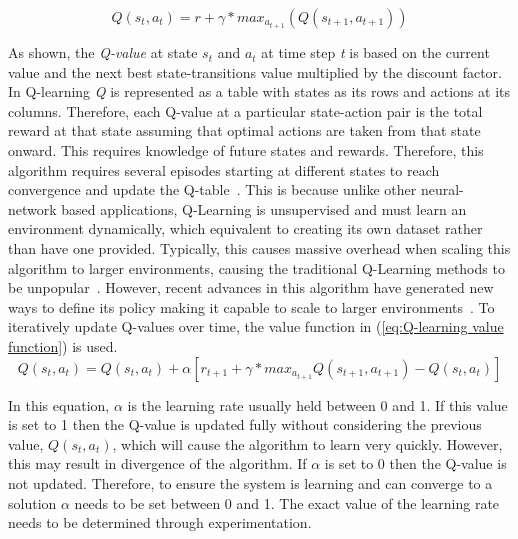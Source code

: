 \documentclass[12pt,american]{report}
\begin{document}
        \begin{equation}
            \label{eq:bellman}
            Q(s_{t},a_{t}) = r + \gamma*max_{a_{t+1} }(Q(s_{t+1},a_{t+1}))
        \end{equation}
        
        As shown, the \textit{Q-value} at state \textit{$s_t$} and \textit{$a_t$} at time step \textit{t} is based on the current value and the next best state-transitions value multiplied by the discount factor. In Q-learning \textit{Q} is represented as a table with states as its rows and actions at its columns.  Therefore, each Q-value at a particular state-action pair is the total reward at that state assuming that optimal actions are taken from that state onward.  This requires knowledge of future states and rewards.  Therefore, this algorithm requires several episodes starting at different states to reach convergence and update the Q-table~\cite{Watkins:1992}. This is because unlike other neural-network based applications, Q-Learning is unsupervised and must learn an environment dynamically, which equivalent to creating its own dataset rather than have one provided. Typically, this causes massive overhead when scaling this algorithm to larger environments, causing the traditional Q-Learning methods to be unpopular~\cite{peng2015mobile}.  However, recent advances in this algorithm have generated new ways to define its policy making it capable to scale to larger environments~\cite{Greedy}. To iteratively update Q-values over time, the value function in (\ref{eq:Q-learning value function}) is used. 
        \begin{equation}
            \label{eq:Q-learning value function}
            Q(s_{t},a_{t}) = Q(s_{t},a_{t}) + \alpha[r_{t+1} + \gamma*max_{a_{t+1} }Q(s_{t+1},a_{t+1})-Q(s_{t},a_{t})]
        \end{equation}
        
        In this equation, \textit{$\alpha$} is the learning rate usually held between 0 and 1.  If this value is set to 1 then the Q-value is updated fully without considering the previous value, \textit{$Q(s_t,a_t)$}, which will cause the algorithm to learn very quickly. However, this may result in divergence of the algorithm.  If \textit{$\alpha$} is set to 0 then the Q-value is not updated.  Therefore, to ensure the system is learning and can converge to a solution \textit{$\alpha$} needs to be set between 0 and 1. The exact value of the learning rate needs to be determined through experimentation.
        
\end{document}
